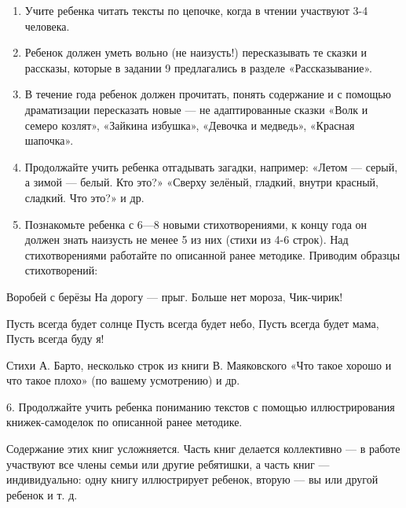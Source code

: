 \documentclass{book}
\begin{document}
\begin{enumerate}
\def\labelenumi{\arabic{enumi}.}
\item
  
  Учите ребенка читать тексты по цепочке, когда в чтении участвуют 3-4
  человека.
  
\item
  
  Ребенок должен уметь вольно (не наизусть!) пересказывать те сказки и
  рассказы, которые в задании 9 предлагались в разделе «Рассказывание».
  
\item
  
  В течение года ребенок должен прочитать, понять содержание и с помощью
  драматизации пересказать новые --- не адаптированные сказки «Волк и
  семеро козлят», «Зайкина избушка», «Девочка и медведь», «Красная
  шапочка».
  
\item
  
  Продолжайте учить ребенка отгадывать загадки, например: «Летом ---
  серый, а зимой --- белый. Кто это?» «Сверху зелёный, гладкий, внутри
  красный, сладкий. Что это?» и др.
  
\item
  
  Познакомьте ребенка с 6---8 новыми стихотворениями, к концу года он
  должен знать наизусть не менее 5 из них (стихи из 4-6 строк). Над
  стихотворениями работайте по описанной ранее методике. Приводим
  образцы стихотворений:
  
\end{enumerate}


Воробей с берёзы На дорогу --- прыг. Больше нет мороза, Чик-чирик!

Пусть всегда будет солнце Пусть всегда будет небо, Пусть всегда будет
мама, Пусть всегда буду я!

Стихи А. Барто, несколько строк из книги В. Маяковского «Что такое
хорошо и что такое плохо» (по вашему усмотрению) и др.

6. Продолжайте учить ребенка пониманию текстов с помощью иллюстрирования
книжек-самоделок по описанной ранее методике.

Содержание этих книг усложняется. Часть книг делается коллективно --- в
работе участвуют все члены семьи или другие ребятишки, а часть книг ---
индивидуально: одну книгу иллюстрирует ребенок, вторую --- вы или другой
ребенок и т. д.
\end{document}
